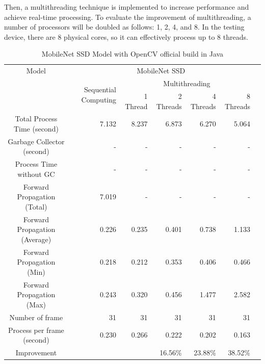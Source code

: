             Then, a multithreading technique is implemented to increase performance and achieve real-time processing.
            To evaluate the improvement of multithreading, a number of processors will be doubled as follows: 1, 2, 4, and 8.
            In the testing device, there are 8 physical cores, so it can effectively process up to 8 threads.

            \begin{table}[!htp]\centering
                \scriptsize
                \begin{tabular}{lrrrrrrr}\toprule
                    \multicolumn{2}{c}{Model} &\multicolumn{5}{c}{MobileNet SSD} \\\cmidrule{1-7}
                    \multicolumn{2}{c}{\multirow{2}{*}{}} &\multirow{2}{*}{Sequential Computing} &\multicolumn{4}{c}{Multithreading} \\\cmidrule{4-7}
                    & & &1 Thread &2 Threads &4 Threads &8 Threads \\\midrule
                    \multicolumn{2}{c}{Total Process Time (second)} &7.132 &8.237 &6.873 &6.270 &5.064 \\
                    \multicolumn{2}{c}{Garbage Collector (second)} &- &- &- &- &- \\
                    \multicolumn{2}{c}{Process Time without GC} &- &- &- &- &- \\
                    \multicolumn{2}{c}{Forward Propagation (Total)} &7.019 &- &- &- &- \\
                    \multicolumn{2}{c}{Forward Propagation (Average)} &0.226 &0.235 &0.401 &0.738 &1.133 \\
                    \multicolumn{2}{c}{Forward Propagation (Min)} &0.218 &0.212 &0.353 &0.406 &0.466 \\
                    \multicolumn{2}{c}{Forward Propagation (Max)} &0.243 &0.320 &0.456 &1.477 &2.582 \\
                    \multicolumn{2}{c}{Number of frame} &31 &31 &31 &31 &31 \\
                    \multicolumn{2}{c}{Process per frame (second)} &0.230 &0.266 &0.222 &0.202 &0.163 \\
                    \multicolumn{2}{c}{Improvement} & & &16.56\% &23.88\% &38.52\% \\
                    \bottomrule
                \end{tabular}

                \caption{MobileNet SSD Model with OpenCV official build in Java}\label{ssd:official-performace}
            \end{table}

